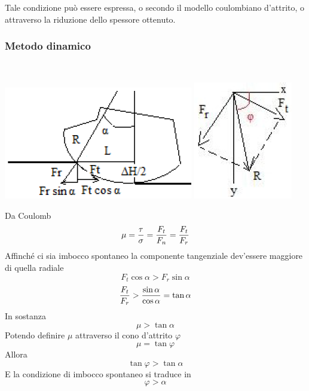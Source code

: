 \documentclass[a4paper, 15pt]{article}
\begin{document}
	Tale condizione può essere espressa, o secondo il modello coulombiano d'attrito, o attraverso la riduzione dello spessore ottenuto. 
	\newpage
	\subsubsection{Metodo dinamico}\mbox{} \\
\begin{center}
	\includegraphics[width=0.3\linewidth]{figures/def9.0}
	\includegraphics[width=0.2\linewidth]{figures/def9}
\end{center}	
	Da Coulomb
	\[\mu = {\tau\over\sigma} = {F_t\over F_n} = {F_t\over F_r}\]
	Affinché ci sia imbocco spontaneo la componente tangenziale dev'essere maggiore di quella radiale
	\[F_t\cos\alpha>F_r\sin\alpha\]
	\[{F_t\over F_r}>{\sin\alpha\over\cos\alpha} = \tan\alpha\]
	In sostanza 
	\[\mu>\tan\alpha\]
	Potendo definire $\mu$ attraverso il cono d'attrito $\varphi$
	\[\mu = \tan\varphi\]
	Allora
	\[\tan\varphi>\tan\alpha\]
	E la condizione di imbocco spontaneo si traduce in 
	\begin{equation}\label{eq:imb1}
		\boxed{\varphi>\alpha}
	\end{equation}
\newpage
\end{document}
